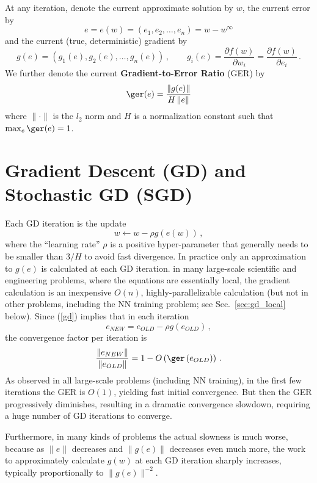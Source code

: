 \documentclass{article} %
\begin{document}
At any iteration, denote the current approximate solution by $w$, the current error by
\begin{equation}
	e = e(w) = (e_1, e_2, \dots, e_n) = w - w^{\infty}
	\label{error}
\end{equation}
and the current (true, deterministic) gradient by
$$
	g(e) = \left(g_1(e), g_2(e), \dots, g_n(e)\right)\,,\qquad g_i(e) = \frac{\partial f(w)}{\partial w_i} = \frac{\partial f(w)}{\partial e_i}\,.
$$
We further denote the current \textbf{Gradient-to-Error Ratio} (GER) by
\begin{equation}
	\ger(e) = \frac{\left\| g(e) \right\|}{H \left\| e \right\|}
	\label{ger}
\end{equation}
where $\|\cdot\|$ is the $l_2$ norm and $H$ is a normalization constant such that $\max_e \ger(e) = 1$.

\section{Gradient Descent (GD) and Stochastic GD (SGD)}
\label{sec:gd}

Each GD iteration is the update
\begin{equation}
	w \longleftarrow w - \rho g\left(e(w)\right)\,,
	\label{gd}
\end{equation}
where the ``learning rate'' $\rho$ is a positive hyper-parameter that generally needs to be smaller than $3 / H$ to avoid fast divergence. In practice only an approximation to $g(e)$ is calculated at each GD iteration. in many large-scale scientific and engineering problems, where the equations are essentially local, the gradient calculation is an inexpensive $O(n)$, highly-parallelizable calculation (but not in other problems, including the NN training problem; see Sec.~\ref{sec:gd_local} below). Since (\ref{gd}) implies that in each iteration
$$
	e_{NEW} = e_{OLD} - \rho g\left(e_{OLD}\right)\,,
$$
the convergence factor per iteration is
$$
	\frac{\left\|e_{NEW}\right\|}{\left\|e_{OLD}\right\|} = 1 - O\left(\ger\left(e_{OLD}\right)\right)\,.
$$
As observed in all large-scale problems (including NN training), in the first few iterations the GER is $O(1)$, yielding fast initial convergence. But then the GER progressively diminishes, resulting in a dramatic convergence slowdown, requiring a huge number of GD iterations to converge.

Furthermore, in many kinds of problems the actual slowness is much worse, because as $\|e\|$ decreases and $\|g(e)\|$ decreases even much more, the work to approximately calculate $g(w)$ at each GD iteration sharply increases, typically proportionally to $\|g(e)\|^{-2}$.
\end{document}
